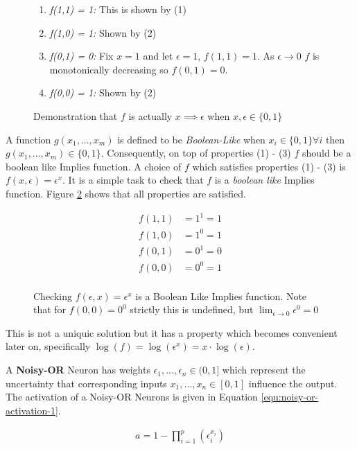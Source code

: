 \begin{figure}[H]
\begin{enumerate}
\item \textit{f(1,1) = 1:} This is shown by (1)
\item \textit{f(1,0) = 1:} Shown by (2)
\item \textit{f(0,1) = 0:} Fix $x = 1$ and let $\epsilon = 1$, $f(1,1) = 1$. As $\epsilon \rightarrow 0 $ $f$ is monotonically decreasing so $f(0,1) = 0$.
\item \textit{f(0,0) = 1:} Shown by (2)
\end{enumerate}
\caption{Demonstration that $f$ is actually $x \implies \epsilon$ when $x,\epsilon \in \{0, 1\}$}
\label{fig:f-actually-implies}
\end{figure}
A function $g(x_1, ..., x_m)$ is defined to be \textit{Boolean-Like} \cite{williams1986logic} when $x_i \in \{0, 1\} \forall i$ then $g(x_1, ..., x_m) \in \{0, 1\}$. Consequently, on top of properties (1) - (3) $f$ should be a boolean like Implies function. A choice of $f$ which satisfies properties (1) - (3) is $f(x, \epsilon) = \epsilon^x$. It is a simple task to check that $f$ is a \textit{boolean like} Implies function. Figure \ref{fig:f-check-implies} shows that all properties are satisfied.

\begin{figure}[H]
\begin{align*}
f(1,1) &= 1^1 = 1\\
f(1,0) &= 1^0 = 1\\
f(0,1) &= 0^1 = 0\\
f(0,0) &= 0^0 = 1\\
\end{align*}
\caption{Checking $f(\epsilon, x) = \epsilon^x$ is a Boolean Like Implies function. Note that for $f(0,0) = 0^0$ strictly this is undefined, but $\lim_{\epsilon \rightarrow 0} \epsilon^0 = 0$}
\label{fig:f-check-implies}
\end{figure}

This is not a uniquic solution but it has a property which becomes convenient later on, specifically $\log(f) = \log(\epsilon^x) = x \cdot \log(\epsilon)$.

\begin{definition}
	A \textbf{Noisy-OR} Neuron has weights $\epsilon_1, ..., \epsilon_n \in (0,1]$ which represent the uncertainty that corresponding inputs $x_1, ..., x_n \in [0,1]$ influence the output. The activation of a Noisy-OR Neurons is given in Equation \ref{equ:noisy-or-activation-1}.
	
	\begin{align}
	a = 1 - \prod^p_{i=1} (\epsilon_i^{x_i})
	\label{equ:noisy-or-activation-1}
	\end{align}
\end{definition}


